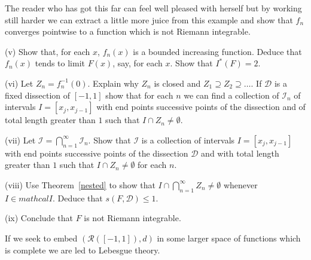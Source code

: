 \begin{exercise}
The reader who has got this far can feel well pleased
with herself but by working still harder
we can extract a little more juice from this example
and show that $f_{n}$ converges pointwise to a function
which is not Riemann integrable.

(v) Show that, for each $x$, $f_{n}(x)$ is a bounded increasing
function. Deduce that $f_{n}(x)$ tends to limit $F(x)$,
say, for each $x$. Show that $I^{*}(F)=2$.

(vi)  Let $Z_{n}=f_{n}^{-1}(0)$. Explain why $Z_{n}$
is closed and $Z_{1}\supseteq Z_{2}\supseteq \dots$.
If $\mathcal{D}$ is a fixed dissection of $[-1,1]$
show that for each $n$ we can find a collection
of  $\mathcal{I}_{n}$ of intervals $I=[x_{j},x_{j-1}]$
with end points successive points of the dissection
and of total length greater than $1$ such that
$I\cap Z_{n}\neq\emptyset$.

(vii) Let $\mathcal{I}=\bigcap_{n=1}^{\infty}\mathcal{I}_{n}$.
Show that $\mathcal{I}$ is a collection
of intervals $I=[x_{j},x_{j-1}]$
with end points successive points of the dissection
$\mathcal{D}$
and with total length greater than $1$ such that
$I\cap Z_{n}\neq\emptyset$ for each $n$.

(viii) Use Theorem~\ref{nested} to
show that $I\cap\bigcap_{n=1}^{\infty}Z_{n}\neq\emptyset$
whenever $I\in mathcal{I}$. Deduce that
$s(F,\mathcal{D})\leq 1$.

(ix) Conclude that $F$ is not Riemann integrable.
\end{exercise}

If we seek to embed $({\mathcal R}([-1,1]),d)$ in
some larger space of functions which is complete
we are led to Lebesgue theory.
